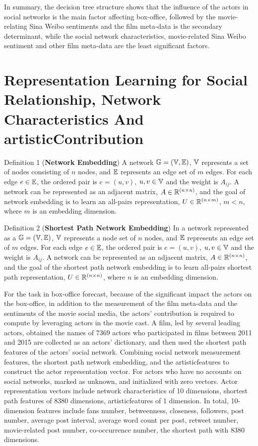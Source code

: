 \documentclass[review]{cvpr}
\begin{document}
\par In summary, the decision tree structure shows that the influence of the actors in social networks is the main factor affecting box-office,
followed by the movie-relating Sina Weibo sentiments and the film meta-data is the secondary determinant,
while the social network characteristics, movie-related Sina Weibo sentiment and other film meta-data are the least significant factors.

\section{Representation Learning for Social Relationship, Network Characteristics And artisticContribution}

\par \noindent Definition 1 (\textbf{Network Embedding})  A network $\Bbb G=(\Bbb V,\Bbb E)$, $\Bbb V$ represents a set of nodes consisting of $n$ nodes, and $\Bbb E$ represents an edge set of $m$ edges.
For each edge $e\in \Bbb E$, the ordered pair is $e=(u,v)$, $u,v \in \Bbb V$ and the weight is $A_{ij}$.
A network can be represented as an adjacent matrix, $A\in \Bbb R^{(n\times n)}$, and the goal of network embedding is to learn an all-pairs representation, $U\in \Bbb R^{(n\times m)}$, $m < n$, where $m$ is an embedding dimension.

\par \noindent Definition 2 (\textbf{Shortest Path Network Embedding})  In a network represented as a $\Bbb G=(\Bbb V,\Bbb E)$, $\Bbb V$ represents a node set of $n$ nodes, and $\Bbb E$ represents an edge set of $m$ edges.
For each edge $e\in \Bbb E$, the ordered pair is $e=(u,v)$, $u,v \in \Bbb V$ and the weight is $A_{ij}$.
A network can be represented as an adjacent matrix, $A\in \Bbb R^{(n\times n)}$, and the goal of the shortest path network embedding is to learn all-pairs shortest path representation, $U\in \Bbb R^{(n\times n)}$, where $n$ is an embedding dimension.

\par For the task in box-office forecast, because of the significant impact the actors on the box-office, in addition to the measurement of the film meta-data and the sentiments of the movie social media,
the actors' contribution is required to compute by leveraging actors in the movie cast.
A film, led by several leading actors, obtained the names of $7369$ actors who participated in films between 2011 and 2015 are collected as an actors' dictionary, and then used the shortest path features of the actors' social network.
Combining social network measurement features, the shortest path network embedding, and the artisticfeatures to construct the actor representation vector.
For actors who have no accounts on social networks, marked as unknown, and initialized with zero vectors.
Actor representation vectors include network characteristics of 10 dimensions, shortest path features of 8380 dimensions, artisticfeatures of 1 dimension.
In total, 10-dimension features include fans number, betweenness, closeness, followers, post number, average post interval, average word count per post, retweet number, movie-related post number, co-occurrence number, the shortest path with 8380 dimensions.
\end{document}
